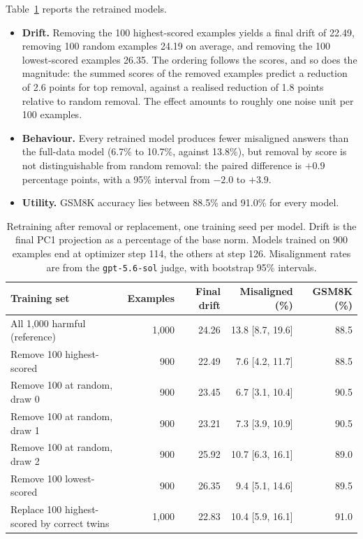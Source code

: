 \documentclass[10pt]{article}
\begin{document}
Table~\ref{tab:e3-retrain} reports the retrained models.
\begin{itemize}
  \item \textbf{Drift.} Removing the 100 highest-scored examples yields a final drift of 22.49,
  removing 100 random examples 24.19 on average, and removing the 100 lowest-scored examples
  26.35. The ordering follows the scores, and so does the magnitude: the summed scores of the
  removed examples predict a reduction of 2.6 points for top removal, against a realised reduction
  of 1.8 points relative to random removal. The effect amounts to roughly one noise unit per 100
  examples.
  \item \textbf{Behaviour.} Every retrained model produces fewer misaligned answers than the
  full-data model (6.7\% to 10.7\%, against 13.8\%), but removal by score is not distinguishable
  from random removal: the paired difference is $+0.9$ percentage points, with a 95\% interval
  from $-2.0$ to $+3.9$.
  \item \textbf{Utility.} GSM8K accuracy lies between 88.5\% and 91.0\% for every model.
\end{itemize}

\begin{table}[H]
  \centering
  \small
  \caption{Retraining after removal or replacement, one training seed per model. Drift is the
  final PC1 projection as a percentage of the base norm. Models trained on 900 examples end at
  optimizer step 114, the others at step 126. Misalignment rates are from the
  \texttt{gpt-5.6-sol} judge, with bootstrap 95\% intervals.}
  \label{tab:e3-retrain}
  \begin{tabular}{@{}lrrrr@{}}
    \toprule
    Training set & Examples & Final drift & Misaligned (\%) & GSM8K (\%) \\
    \midrule
    All 1,000 harmful (reference) & 1,000 & 24.26 & 13.8 [8.7, 19.6] & 88.5 \\
    Remove 100 highest-scored & 900 & 22.49 & 7.6 [4.2, 11.7] & 88.5 \\
    Remove 100 at random, draw 0 & 900 & 23.45 & 6.7 [3.1, 10.4] & 90.5 \\
    Remove 100 at random, draw 1 & 900 & 23.21 & 7.3 [3.9, 10.9] & 90.5 \\
    Remove 100 at random, draw 2 & 900 & 25.92 & 10.7 [6.3, 16.1] & 89.0 \\
    Remove 100 lowest-scored & 900 & 26.35 & 9.4 [5.1, 14.6] & 89.5 \\
    Replace 100 highest-scored by correct twins & 1,000 & 22.83 & 10.4 [5.9, 16.1] & 91.0 \\
    \bottomrule
  \end{tabular}
\end{table}
\end{document}
